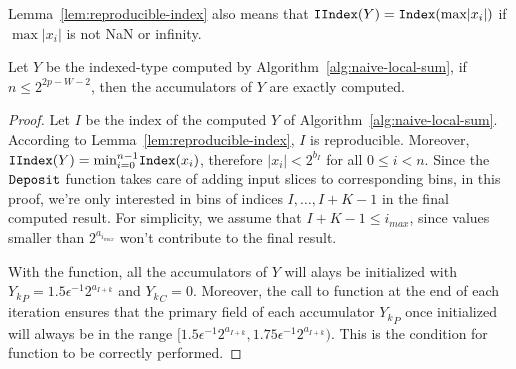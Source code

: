     Lemma~\ref{lem:reproducible-index} also means that $\mathtt{IIndex}(Y) = \mathtt{Index}(\text{max} |x_i|)$
    if $\max |x_i|$ is not NaN or infinity.

  \begin{lem}
    Let $Y$ be the indexed-type computed by Algorithm~\ref{alg:naive-local-sum},
    if $n \leq 2^{2p -W - 2}$, then the accumulators of $Y$ are exactly computed.
    \label{lem:exact-local-Y}
  \end{lem}
  \begin{proof}
    Let $I$ be the index of the computed $Y$ of Algorithm~\ref{alg:naive-local-sum}.
    According to Lemma~\ref{lem:reproducible-index}, $I$ is reproducible.
    Moreover, $\mathtt{IIndex}(Y) = \text{min}_{i=0}^{n-1} \mathtt{Index}(x_i)$,
    therefore $|x_i| < 2^{b_I}$ for all $0 \leq i < n$.
    Since the $\mathtt{Deposit}$ function takes care of adding input slices
    to corresponding bins, in this proof, we're only interested in bins of
    indices $I, \ldots, I+K-1$ in the final computed result.
    For simplicity, we assume that $I+K-1 \leq i_{max}$, since values smaller
    than $2^{a_{i_{max}}}$ won't contribute to the final result.

    With the  function, all the accumulators of $Y$ will alays be initialized
    with ${Y_k}_P = 1.5 \epsilon^{-1} 2^{a_{I+k}}$ and ${{Y_k}}_C = 0$.
    Moreover, the call to  function at the end of each iteration
    ensures that the primary field of each accumulator ${Y_k}_P$ once initialized
    will always be in the range
    $[1.5 \epsilon^{-1} 2^{a_{I+k}}, 1.75 \epsilon^{-1} 2^{a_{I+k}})$.
    This is the condition for  function to be correctly performed.


\end{proof}
